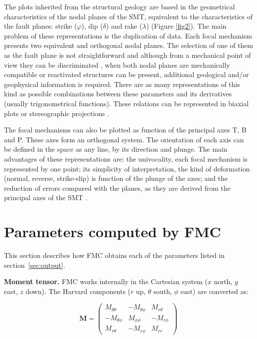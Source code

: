 \documentclass[11pt,a4paper,english]{article}
\numberwithin{equation}{section}
\begin{document}
The plots inherited from the structural geology are based in the geometrical
characteristics of the nodal planes of the SMT, equivalent to the
characteristics of the fault planes: strike ($\varphi$), dip ($\delta$)
and rake ($\lambda$) (Figure \ref{fig2}). The main problem of these
representations is the duplication of data. Each focal mechanism presents
two equivalent and orthogonal nodal planes. The selection of one of
them as the fault plane is not straightforward and although from a
mechanical point of view they can be discriminated \citep{mcke69,mich87,geph90},
when both nodal planes are mechanically compatible or reactivated
structures can be present, additional geological and/or geophysical
information is required. There are as many representations of this
kind as possible combinations between these parameters and its derivatives
(usually trigonometrical functions). These relations can be represented
in biaxial plots or stereographic projections \citep[e.g.][]{davi96,rams97,poll05}.

The focal mechanisms can also be plotted as function of the principal
axes T, B and P. These axes form an orthogonal system. The orientation
of each axis can be defined in the space as any line, by its direction
and plunge. The main advantages of these representations are: the
univocality, each focal mechanism is represented by one point; its
simplicity of interpretation, the kind of deformation (normal, reverse,
strike-slip) is function of the plunge of the axes; and the reduction
of errors compared with the planes, as they are derived from the principal
axes of the SMT \citep{vann03}.

\section{Parameters computed by FMC}
\label{sec:parameters-computed-by-fmc}

This section describes how FMC obtains each of the parameters listed in
section~\ref{sec:output}.

\textbf{Moment tensor.} FMC works internally in the \citet{aki80} Cartesian system (\(x\) north,
\(y\) east, \(z\) down). The Harvard components (\(r\) up, \(\theta\) south, \(\phi\) east) are
converted as:

\[
\mathbf{M} = \begin{pmatrix} M_{\theta\theta} & -M_{\theta\phi} & M_{r\theta} \\ -M_{\theta\phi} & M_{\phi\phi} & -M_{r\phi} \\ M_{r\theta} & -M_{r\phi} & M_{rr} \end{pmatrix}
\]
\end{document}
